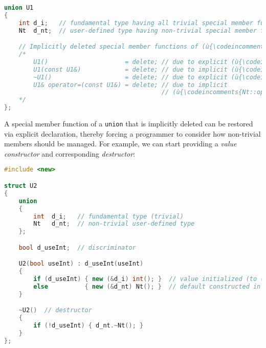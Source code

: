 \begin{lstlisting}[language=C++]
union U1
{
    int d_i;   // fundamental type having all trivial special member functions
    Nt  d_nt;  // user-defined type having non-trivial special member functions

    // Implicitly deleted special member functions of (ù{\codeincomments{U1}}ù):
    /*
        U1()                     = delete; // due to explicit (ù{\codeincomments{Nt::Nt()}}ù)
        U1(const U1&)            = delete; // due to implicit (ù{\codeincomments{Nt::Nt(const Nt\&)}}ù)
        ~U1()                    = delete; // due to explicit (ù{\codeincomments{Nt::}}ù)~(ù{\codeincomments{Nt()}}ù)
        U1& operator=(const U1&) = delete; // due to implicit 
                                           // (ù{\codeincomments{Nt::operator=(const Nt\&)}}ù)
    */
};
\end{lstlisting}
    

A special member function of a \lstinline!union! that is implicitly deleted
can be restored via explicit declaration, thereby forcing a programmer
to consider how non-trivial members should be managed. For example,
we can start providing a \emph{value constructor} and corresponding
\emph{destructor}:

%
%
%
\begin{lstlisting}[language=C++]
#include <new>

struct U2
{
    union
    {
        int  d_i;   // fundamental type (trivial)
        Nt   d_nt;  // non-trivial user-defined type
    };

    bool d_useInt;  // discriminator

    U2(bool useInt) : d_useInt(useInt)       
    {
        if (d_useInt) { new (&d_i) int(); }  // value initialized (to (ù{\codeincomments{0}}ù))
        else          { new (&d_nt) Nt(); }  // default constructed in place
    }

    ~U2()  // destructor
    {
        if (!d_useInt) { d_nt.~Nt(); }
    }
};
\end{lstlisting}

